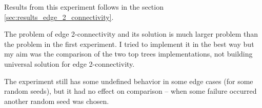Results from this experiment follows in the section \ref{sec:results_edge_2_connectivity}.

\bigskip

The problem of edge 2-connectivity and its solution is much larger problem than
the problem in the first experiment. I tried to implement it in the best way
but my aim was the comparison of the two top trees implementations, not
building universal solution for edge 2-connectivity.

The experiment still has some undefined behavior in some edge cases (for some
random seeds), but it had no effect on comparison -- when some failure occurred
another random seed was chosen.
